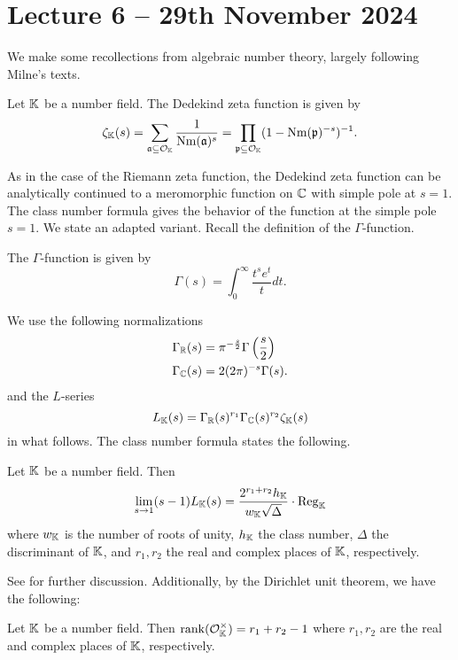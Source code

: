\section{Lecture 6 -- 29th November 2024}\label{sec: lecture 6}
We make some recollections from algebraic number theory, largely following Milne's texts. 
\begin{definition}\label{def: Dedekind zeta}
    Let $\mathbb{K}$ be a number field. The Dedekind zeta function is given by 
    $$\zeta_{\mathbb{K}}(s)=\sum_{\mathfrak{a}\subseteq\mathcal{O}_{\mathbb{K}}}\frac{1}{\mathrm{Nm}(\mathfrak{a})^{s}}=\prod_{\mathfrak{p}\subseteq\mathcal{O}_{\mathbb{K}}}(1-\mathrm{Nm}(\mathfrak{p})^{-s})^{-1}.$$
\end{definition}
As in the case of the Riemann zeta function, the Dedekind zeta function can be analytically continued to a meromorphic function on $\mathbb{C}$ with simple pole at $s=1$. The class number formula gives the behavior of the function at the simple pole $s=1$. We state an adapted variant. Recall the definition of the $\Gamma$-function. 
\begin{definition}\label{def: gamma function}
    The $\Gamma$-function is given by 
    $$\Gamma(s)=\int_{0}^{\infty}\frac{t^{s}e^{t}}{t}dt.$$
\end{definition}
We use the following normalizations 
\begin{align*}
    \Gamma_{\mathbb{R}}(s) &= \pi^{-\frac{s}{2}}\Gamma\left(\frac{s}{2}\right) \\
    \Gamma_{\mathbb{C}}(s) &= 2(2\pi)^{-s}\Gamma(s).
\end{align*}
and the $L$-series 
\begin{equation}\label{eqn: L-series}
    L_{\mathbb{K}}(s)=\Gamma_{\mathbb{R}}(s)^{r_{1}}\Gamma_{\mathbb{C}}(s)^{r_{2}}\zeta_{\mathbb{K}}(s)
\end{equation}
in what follows. The class number formula states the following. 
\begin{theorem}\label{thm: class number formula}
    Let $\mathbb{K}$ be a number field. Then 
    $$\lim_{s\to 1}(s-1)L_{\mathbb{K}}(s)=\frac{2^{r_{1}+r_{2}}h_{\mathbb{K}}}{w_{\mathbb{K}}\sqrt{\Delta}}\cdot\mathrm{Reg}_{\mathbb{K}}$$
    where $w_{\mathbb{K}}$ is the number of roots of unity, $h_{\mathbb{K}}$ the class number, $\Delta$ the discriminant of $\mathbb{K}$, and $r_{1},r_{2}$ the real and complex places of $\mathbb{K}$, respectively.  
\end{theorem}
See \cite[\S V.2]{milneCFT} for further discussion. Additionally, by the Dirichlet unit theorem, we have the following:
\begin{theorem}\label{thm: Dirichlet unit}
    Let $\mathbb{K}$ be a number field. Then $\mathrm{rank}(\mathcal{O}_{\mathbb{K}}^{\times})=r_{1}+r_{2}-1$ where $r_{1},r_{2}$ are the real and complex places of $\mathbb{K}$, respectively. 
\end{theorem}
